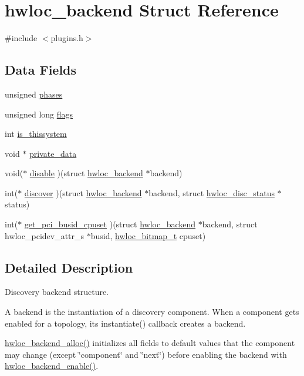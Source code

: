 \hypertarget{a00374}{}\section{hwloc\+\_\+backend Struct Reference}
\label{a00374}


{\ttfamily \#include $<$plugins.\+h$>$}

\subsection*{Data Fields}
\begin{DoxyCompactItemize}
\item 
unsigned \hyperlink{a00374_aeca769840a6ff03e96462a9533adbccd}{phases}
\item 
unsigned long \hyperlink{a00374_aaa8eafe495aadd81c2e3c4ec527c10ba}{flags}
\item 
int \hyperlink{a00374_ab8806f6db077f1bb2e9d63ec99223f7a}{is\+\_\+thissystem}
\item 
void $\ast$ \hyperlink{a00374_a2ea5bd36b7f06efdb65b98b32af16c68}{private\+\_\+data}
\item 
void($\ast$ \hyperlink{a00374_a36c4fa86350525b46340c67b802c69c7}{disable} )(struct \hyperlink{a00374}{hwloc\+\_\+backend} $\ast$backend)
\item 
int($\ast$ \hyperlink{a00374_accff2cd8404be43c3b44cec05e6f609b}{discover} )(struct \hyperlink{a00374}{hwloc\+\_\+backend} $\ast$backend, struct \hyperlink{a00370}{hwloc\+\_\+disc\+\_\+status} $\ast$status)
\item 
int($\ast$ \hyperlink{a00374_aaac253491264c20930f44817270bc502}{get\+\_\+pci\+\_\+busid\+\_\+cpuset} )(struct \hyperlink{a00374}{hwloc\+\_\+backend} $\ast$backend, struct hwloc\+\_\+pcidev\+\_\+attr\+\_\+s $\ast$busid, \hyperlink{a00205_gaa3c2bf4c776d603dcebbb61b0c923d84}{hwloc\+\_\+bitmap\+\_\+t} cpuset)
\end{DoxyCompactItemize}


\subsection{Detailed Description}
Discovery backend structure. 

A backend is the instantiation of a discovery component. When a component gets enabled for a topology, its instantiate() callback creates a backend.

\hyperlink{a00228_gadb068565ab6043cbe4d16bfcce067a61}{hwloc\+\_\+backend\+\_\+alloc()} initializes all fields to default values that the component may change (except \char`\"{}component\char`\"{} and \char`\"{}next\char`\"{}) before enabling the backend with \hyperlink{a00228_ga4715779d7191833e9b1a7490989a7497}{hwloc\+\_\+backend\+\_\+enable()}.

